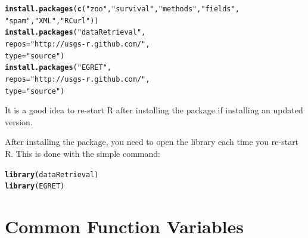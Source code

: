 \documentclass[a4paper,11pt]{article}\usepackage{graphicx, color}
\makeatletter
\newcommand{\hlfunctioncall}[1]{\textcolor[rgb]{0.501960784313725,0,0.329411764705882}{\textbf{#1}}}%
\newcommand{\hlstring}[1]{\textcolor[rgb]{0.6,0.6,1}{#1}}%
\newenvironment{kframe}{%
 \def\at@end@of@kframe{}%
 \ifinner\ifhmode%
  \def\at@end@of@kframe{\end{minipage}}%
  \begin{minipage}{\columnwidth}%
 \fi\fi%
 \def\FrameCommand##1{\hskip\@totalleftmargin \hskip-\fboxsep
 \colorbox{shadecolor}{##1}\hskip-\fboxsep
     \hskip-\linewidth \hskip-\@totalleftmargin \hskip\columnwidth}%
 \MakeFramed {\advance\hsize-\width
   \@totalleftmargin\z@ \linewidth\hsize
   \@setminipage}}%
 {\par\unskip\endMakeFramed%
 \at@end@of@kframe}
\newenvironment{knitrout}{}{} %
\makeatother
\begin{document}
\begin{knitrout}
\color{fgcolor}\begin{kframe}
\begin{alltt}
\hlfunctioncall{install.packages}(\hlfunctioncall{c}(\hlstring{"zoo"},\hlstring{"survival"},\hlstring{"methods"},\hlstring{"fields"},
                   \hlstring{"spam"},\hlstring{"XML"},\hlstring{"RCurl"}))
\hlfunctioncall{install.packages}(\hlstring{"dataRetrieval"}, 
                 repos=\hlstring{"http://usgs-r.github.com/"}, 
                 type=\hlstring{"source"})
\hlfunctioncall{install.packages}(\hlstring{"EGRET"}, 
                 repos=\hlstring{"http://usgs-r.github.com/"}, 
                 type=\hlstring{"source"})
\end{alltt}
\end{kframe}
\end{knitrout}


It is a good idea to re-start R after installing the package if installing an updated version. 

After installing the package, you need to open the library each time you re-start R.  This is done with the simple command:
\begin{knitrout}
\color{fgcolor}\begin{kframe}
\begin{alltt}
\hlfunctioncall{library}(dataRetrieval)
\hlfunctioncall{library}(EGRET)
\end{alltt}
\end{kframe}
\end{knitrout}


\newpage
\FloatBarrier
\section{Common Function Variables}
\label{sec:appendixPlot}
\end{document}
